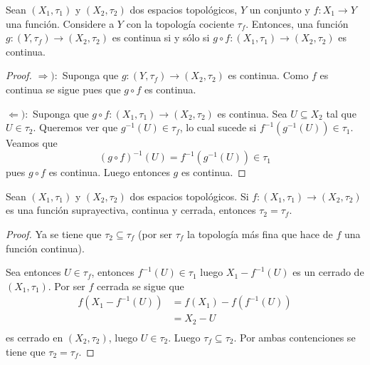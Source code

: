 \documentclass[12pt]{report}
\theoremstyle{largebreak}
\newcommand\cf[3]{\ensuremath{#1:#2\rightarrow#3}}
\begin{document}
    \begin{propo}
        Sean $(X_1,\tau_1)$ y $(X_2,\tau_2)$ dos espacios topológicos, $Y$ un conjunto y $\cf{f}{X_1}{Y}$ una función. Considere a $Y$ con la topología cociente $\tau_f$. Entonces, una función $\cf{g}{(Y,\tau_f)}{(X_2,\tau_2)}$ es continua si y sólo si $\cf{g\circ f}{(X_1,\tau_1)}{(X_2,\tau_2)}$ es continua.
    \end{propo}

    \begin{proof}
        $\Rightarrow):$ Suponga que $\cf{g}{(Y,\tau_f)}{(X_2,\tau_2)}$ es continua. Como $f$ es continua se sigue pues que $g\circ f$ es continua.
        
        $\Leftarrow):$ Suponga que $\cf{g\circ f}{(X_1,\tau_1)}{(X_2,\tau_2)}$ es continua. Sea $U\subseteq X_2$ tal que $U\in\tau_2$. Queremos ver que $g^{-1}(U)\in\tau_f$, lo cual sucede si $f^{-1}(g^{-1}(U))\in\tau_1$. Veamos que
        \begin{equation*}
            (g\circ f)^{-1}(U)=f^{-1}(g^{-1}(U))\in\tau_1
        \end{equation*}
        pues $g\circ f$ es continua. Luego entonces $g$ es continua.
    \end{proof}

    \begin{propo}
        Sean $(X_1,\tau_1)$ y $(X_2,\tau_2)$ dos espacios topológicos. Si $\cf{f}{(X_1,\tau_1)}{(X_2,\tau_2)}$ es una función suprayectiva, continua y cerrada, entonces $\tau_2=\tau_f$.
    \end{propo}

    \begin{proof}
        Ya se tiene que $\tau_2\subseteq\tau_f$ (por ser $\tau_f$ la topología más fina que hace de $f$ una función continua).

        Sea entonces $U\in\tau_f$, entonces $f^{-1}(U)\in\tau_1$ luego $X_1-f^{-1}(U)$ es un cerrado de $(X_1,\tau_1)$. Por ser $f$ cerrada se sigue que
        \begin{equation*}
            \begin{split}
                f(X_1-f^{-1}(U))&=f(X_1)-f(f^{-1}(U))\\
                &=X_2-U\\
            \end{split}
        \end{equation*}
        es cerrado en $(X_2,\tau_2)$, luego $U\in\tau_2$. Luego $\tau_f\subseteq\tau_2$. Por ambas contenciones se tiene que $\tau_2=\tau_f$.
    \end{proof}
\end{document}
